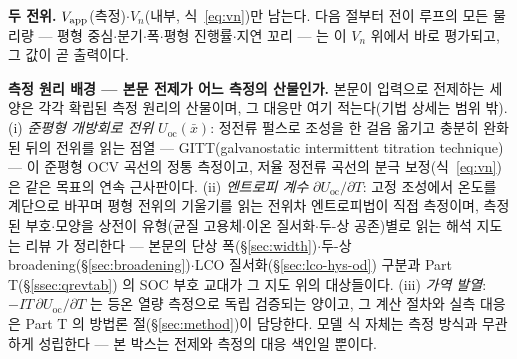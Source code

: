 \begin{keybox}
\textbf{두 전위.} $V_{\mathrm{app}}$(측정)$\cdot$$V_n$(내부, 식~\eqref{eq:vn})만 남는다. 다음 절부터 전이 루프의 모든
물리량 --- 평형 중심$\cdot$분기$\cdot$폭$\cdot$평형 진행률$\cdot$지연 꼬리 --- 는 이 $V_n$ 위에서 바로
평가되고, 그 값이 곧 출력이다.
\end{keybox}

\begin{bgbox}
\textbf{측정 원리 배경 --- 본문 전제가 어느 측정의 산물인가.} 본문이 입력으로 전제하는 세 양은 각각
확립된 측정 원리의 산물이며, 그 대응만 여기 적는다(기법 상세는 범위 밖). (i) \emph{준평형 개방회로 전위}
$U_\mathrm{oc}(\bar x)$: 정전류 펄스로 조성을 한 걸음 옮기고 충분히 완화된 뒤의 전위를 읽는 점열 ---
GITT(galvanostatic intermittent titration technique)\cite{weppner_huggins1977} --- 이 준평형 OCV 곡선의
정통 측정이고, 저율 정전류 곡선의 분극 보정(식~\eqref{eq:vn})은 같은 목표의 연속 근사판이다. (ii)
\emph{엔트로피 계수} $\partial U_\mathrm{oc}/\partial T$: 고정 조성에서 온도를 계단으로 바꾸며 평형 전위의
기울기를 읽는 전위차 엔트로피법이 직접 측정이며\cite{reynier2003,swiderska2019}, 측정된 부호$\cdot$모양을
상전이 유형(균질 고용체$\cdot$이온 질서화$\cdot$두-상 공존)별로 읽는 해석 지도는 리뷰
\cite{baek_pilon2022} 가 정리한다 --- 본문의 단상 폭(\S\ref{sec:width})$\cdot$두-상
broadening(\S\ref{sec:broadening})$\cdot$LCO 질서화(\S\ref{sec:lco-hys-od}) 구분과 Part T(\S\ref{ssec:qrevtab}) 의 SOC 부호
교대가 그 지도 위의 대상들이다. (iii) \emph{가역 발열}: $-IT\,\partial U_\mathrm{oc}/\partial T$ 는 등온
열량 측정으로 독립 검증되는 양이고, 그 계산 절차와 실측 대응은 Part T 의 방법론 절(\S\ref{sec:method})이 담당한다.
모델 식 자체는 측정 방식과 무관하게 성립한다 --- 본 박스는 전제와 측정의 대응 색인일 뿐이다.
\end{bgbox}

